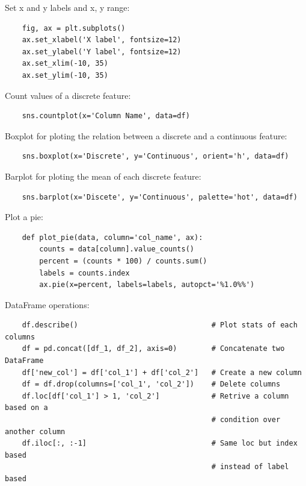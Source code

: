 \documentclass[12pt]{report}
\begin{document}
        Set x and y labels and x, y range:
        
        \begin{verbatim}
    fig, ax = plt.subplots()
    ax.set_xlabel('X label', fontsize=12)
    ax.set_ylabel('Y label', fontsize=12)
    ax.set_xlim(-10, 35)
    ax.set_ylim(-10, 35)
        \end{verbatim}
        
        
        Count values of a discrete feature:
        \begin{verbatim}
    sns.countplot(x='Column Name', data=df)
        \end{verbatim}
        
        Boxplot for ploting the relation between a discrete and a continuous feature:
        \begin{verbatim}
    sns.boxplot(x='Discrete', y='Continuous', orient='h', data=df)
        \end{verbatim}
        
        Barplot for ploting the mean of each discrete feature:
        \begin{verbatim}
    sns.barplot(x='Discete', y='Continuous', palette='hot', data=df)
        \end{verbatim}
        
        Plot a pie:
        \begin{verbatim}
    def plot_pie(data, column='col_name', ax):
        counts = data[column].value_counts()
        percent = (counts * 100) / counts.sum()
        labels = counts.index
        ax.pie(x=percent, labels=labels, autopct='%1.0%%')
        \end{verbatim}
        
        
        DataFrame operations:
        \begin{verbatim}
    df.describe()                               # Plot stats of each columns
    df = pd.concat([df_1, df_2], axis=0)        # Concatenate two DataFrame
    df['new_col'] = df['col_1'] + df['col_2']   # Create a new column
    df = df.drop(columns=['col_1', 'col_2'])    # Delete columns
    df.loc[df['col_1'] > 1, 'col_2']            # Retrive a column based on a 
                                                # condition over another column
    df.iloc[:, :-1]                             # Same loc but index based
                                                # instead of label based
        \end{verbatim}
\end{document}
